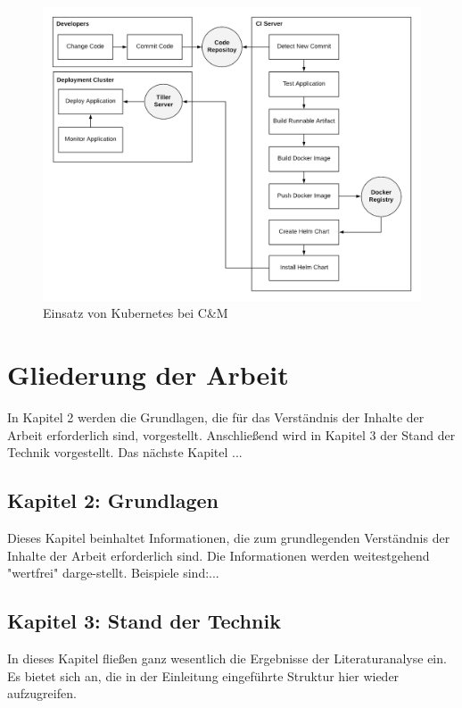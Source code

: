 \begin{figure}[h]
	\centering
	\includegraphics[width=\textwidth]{images/demonstrator.png}
	\caption{Einsatz von Kubernetes bei C\&M}
	\label{fig:demonstrator}
\end{figure}

\section{Gliederung der Arbeit}
\label{sec:gliederung}

In Kapitel 2 werden die Grundlagen, die für das Verständnis der Inhalte der Arbeit erforderlich sind, vorgestellt.
Anschließend wird in Kapitel 3 der Stand der Technik vorgestellt.
Das nächste Kapitel ...


\newpage
\subsection*{Kapitel 2: Grundlagen}

Dieses Kapitel beinhaltet Informationen, die zum grundlegenden Verständnis der Inhalte der Arbeit erforderlich sind. Die Informationen werden weitestgehend "wertfrei" darge-stellt. Beispiele sind:...

\subsection*{Kapitel 3: Stand der Technik}

In dieses Kapitel fließen ganz wesentlich die Ergebnisse der Literaturanalyse ein. Es bietet sich an, die in der Einleitung eingeführte Struktur hier wieder aufzugreifen.

